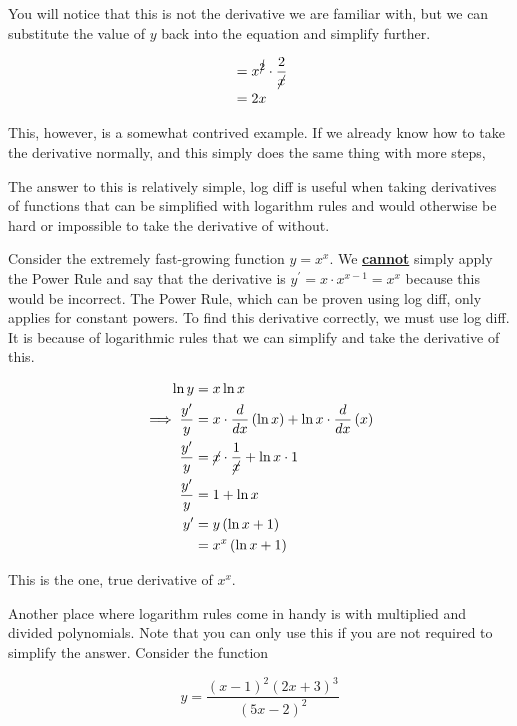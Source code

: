 You will notice that this is not the derivative we are familiar with, but we can substitute the value of \( y \) back into the equation and simplify further.

\begin{align}
    &= x^{\cancel{2}} \cdot \dfrac{2}{\cancel{x}} \\
    &= 2x
\end{align}

This, however, is a somewhat contrived example. If we already know how to take the derivative normally, and this simply does the same thing with more steps, 

The answer to this is relatively simple, log diff is useful when taking derivatives of functions that can be simplified with logarithm rules and would otherwise be hard or impossible to take the derivative of without.

Consider the extremely fast-growing function \( y = x^x \). We {\color{red} \underline{\textbf{cannot}}} simply apply the Power Rule and say that the derivative is \( y^\prime = x \cdot x^{x - 1} = x^x \) because this would be incorrect. The Power Rule, which can be proven using log diff, only applies for constant powers. To find this derivative correctly, we must use log diff. It is because of logarithmic rules that we can simplify and take the derivative of this.

\begin{align}
    \ln{y} &= x \ln{x} \\
    \implies \dfrac{y^\prime}{y} &= x \cdot \frac{d}{dx} \left( \ln{x} \right) + \ln{x} \cdot \frac{d}{dx} \left( x \right) \\
    \dfrac{y^\prime}{y} &= \cancel{x} \cdot \frac{1}{\cancel{x}} + \ln{x} \cdot 1 \\
    \dfrac{y^\prime}{y} &= 1 + \ln{x} \\
    y^\prime &= y \left( \ln{x} + 1 \right) \\
    &= x^x \left( \ln{x} + 1 \right)
\end{align}

This is the one, true derivative of \( x^x \).

Another place where logarithm rules come in handy is with multiplied and divided polynomials. Note that you can only use this if you are not required to simplify the answer. Consider the function

\[ y = \dfrac{\left( x - 1 \right)^2 \left( 2x + 3 \right)^3}{\left( 5x - 2 \right)^2} \]

